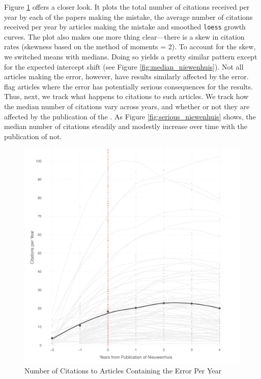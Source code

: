 \documentclass[12pt, letterpaper]{article}
\begin{document}
Figure \ref{fig:niewenhuis} offers a closer look. It plots the total number of citations received per year by each of the papers making the mistake, the average number of citations received per year by articles making the mistake and smoothed \texttt{loess} growth curves. The plot also makes one more thing clear---there is a skew in citation rates (skewness based on the method of moments = 2). To account for the skew, we switched means with medians. Doing so yields a pretty similar pattern except for the expected intercept shift (see Figure \ref{fig:median_niewenhuis}). Not all articles making the error, however, have results similarly affected by the error. \citet{nieuwenhuis2011} flag articles where the error has potentially serious consequences for the results. Thus, next, we track what happens to citations to such articles. We track how the median number of citations vary across years, and whether or not they are affected by the publication of the \citet{nieuwenhuis2011}. As Figure \ref{fig:serious_niewenhuis} shows, the median number of citations steadily and modestly increase over time with the publication of \citet{nieuwenhuis2011} not.

\begin{figure}[H]
\centering
 \includegraphics[scale=.7]{../figs/nw_growth_curve.pdf}
 \caption{Number of Citations to Articles Containing the Error Per Year}
 \label{fig:niewenhuis}
\end{figure}
\end{document}
